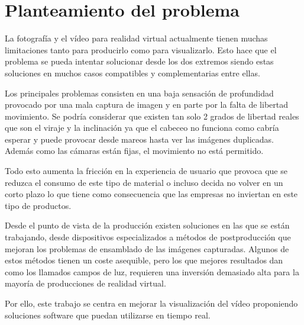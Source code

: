 
\pagestyle{empty}
\chapter {Planteamiento del problema}

La fotografía y el vídeo para realidad virtual actualmente tienen muchas limitaciones tanto para producirlo como para visualizarlo. Esto hace que el problema se pueda intentar solucionar desde los dos extremos siendo estas soluciones en muchos casos compatibles y complementarias entre ellas.

Los principales problemas consisten en una baja sensación de profundidad provocado por una mala captura de imagen y en parte por la falta de libertad movimiento. Se podría considerar que existen tan solo 2 grados de libertad reales que son el viraje y la inclinación ya que el cabeceo no funciona como cabría esperar y puede provocar desde mareos hasta ver las imágenes duplicadas. Además como las cámaras están fijas, el movimiento no está permitido.


Todo esto aumenta la fricción en la experiencia de usuario que provoca que se reduzca el consumo de este tipo de material o incluso decida no volver en un corto plazo lo que tiene como consecuencia que las empresas no inviertan en este tipo de productos.

Desde el punto de vista de la producción existen soluciones en las que se están trabajando, desde dispositivos especializados a métodos de postproducción que mejoran los problemas de ensamblado de las imágenes capturadas. Algunos de estos métodos tienen un coste asequible, pero los que mejores resultados dan como los llamados campos de luz, requieren una inversión demasiado alta para la mayoría de producciones de realidad virtual.

Por ello, este trabajo se centra en mejorar la visualización del vídeo proponiendo soluciones software que puedan utilizarse en tiempo real.